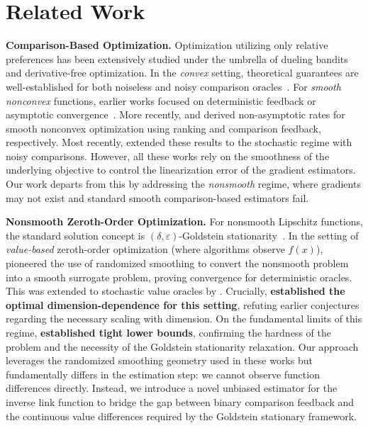 \documentclass[11pt]{article}
\theoremstyle{plain}
\theoremstyle{remark}
\newcommand{\1}{\mathbf{1}}
\begin{document}
\section{Related Work}

\textbf{Comparison-Based Optimization.}
Optimization utilizing only relative preferences has been extensively studied under the umbrella of dueling bandits and derivative-free optimization. In the \emph{convex} setting, theoretical guarantees are well-established for both noiseless and noisy comparison oracles~\cite{pmlr-v139-saha21b,saha2025dueling}. For \emph{smooth nonconvex} functions, earlier works focused on deterministic feedback or asymptotic convergence~\cite{bergou2020stochastic}. More recently, \cite{tang2024zerothorder} and \cite{kadi2025on} derived non-asymptotic rates for smooth nonconvex optimization using ranking and comparison feedback, respectively. Most recently, \cite{bakkali2026noisy} extended these results to the stochastic regime with noisy comparisons. However, all these works rely on the smoothness of the underlying objective to control the linearization error of the gradient estimators. Our work departs from this by addressing the \emph{nonsmooth} regime, where gradients may not exist and standard smooth comparison-based estimators fail.

\textbf{Nonsmooth Zeroth-Order Optimization.}
For nonsmooth Lipschitz functions, the standard solution concept is $(\delta, \varepsilon)$-Goldstein stationarity~\citep{goldstein1977optimization}. In the setting of \emph{value-based} zeroth-order optimization (where algorithms observe $f(x)$), \cite{lin2022gradient} pioneered the use of randomized smoothing to convert the nonsmooth problem into a smooth surrogate problem, proving convergence for deterministic oracles. This was extended to stochastic value oracles by \cite{pmlr-v195-jordan23a}. Crucially, \textbf{\cite{kornowski2023optimal} established the optimal dimension-dependence for this setting}, refuting earlier conjectures regarding the necessary scaling with dimension. On the fundamental limits of this regime, \textbf{\cite{zhang2020complexity} established tight lower bounds}, confirming the hardness of the problem and the necessity of the Goldstein stationarity relaxation. Our approach leverages the randomized smoothing geometry used in these works but fundamentally differs in the estimation step: we cannot observe function differences directly. Instead, we introduce a novel unbiased estimator for the inverse link function to bridge the gap between binary comparison feedback and the continuous value differences required by the Goldstein stationary framework.
\end{document}
